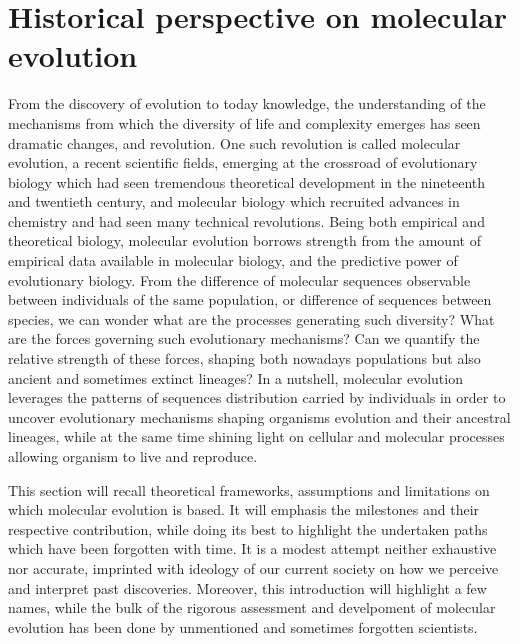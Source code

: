\thispagestyle{empty}
\chapter{Historical perspective on molecular evolution}
{
	\hypersetup{linkcolor=GREYDARK}
	\minitoc
}

\label{sec:intro-historical}

From the discovery of evolution to today knowledge, the understanding of the mechanisms from which the diversity of life and complexity emerges has seen dramatic changes, and revolution.
One such revolution is called molecular evolution, a recent scientific fields, emerging at the crossroad of evolutionary biology which had seen tremendous theoretical development in the nineteenth and twentieth century, and molecular biology which recruited advances in chemistry and had seen many technical revolutions.
Being both empirical and theoretical biology, molecular evolution borrows strength from the amount of empirical data available in molecular biology, and the predictive power of evolutionary biology.
From the difference of molecular sequences observable between individuals of the same population, or difference of sequences between species, we can wonder what are the processes generating such diversity?
What are the forces governing such evolutionary mechanisms?
Can we quantify the relative strength of these forces, shaping both nowadays populations but also ancient and sometimes extinct lineages?
In a nutshell, molecular evolution leverages the patterns of sequences distribution carried by individuals in order to uncover evolutionary mechanisms shaping organisms evolution and their ancestral lineages, while at the same time shining light on cellular and molecular processes allowing organism to live and reproduce.

This section will recall theoretical frameworks, assumptions and limitations on which molecular evolution is based.
It will emphasis the milestones and their respective contribution, while doing its best to highlight the undertaken paths which have been forgotten with time.
It is a modest attempt neither exhaustive nor accurate, imprinted with ideology of our current society on how we perceive and interpret past discoveries.
Moreover, this introduction will highlight a few names, while the bulk of the rigorous assessment and develpoment of molecular evolution has been done by unmentioned and sometimes forgotten scientists.

